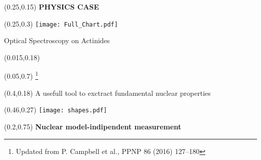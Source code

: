 \documentclass[10pt,aspectratio=169]{beamer}
\begin{document}
\begin{SectionTitle}
\begin{frame}
	\centering
	\begin{textblock*}{0.5\paperwidth}(0.25\paperwidth,0.15\paperheight)
		\centering
		\textbf{\LARGE PHYSICS CASE}	
	\end{textblock*}
	\begin{textblock*}{0.5\paperwidth}(0.25\paperwidth,0.3\paperheight)
        \texttt{[image: Full\_Chart.pdf]}
	\end{textblock*}

\end{frame}
\end{SectionTitle}

\begin{frame}{Optical Spectroscopy on Actinides}
	\begin{textblock*}{0.5\paperwidth}(0.015\paperwidth,0.18\paperheight)
		\begin{textblock*}{0.1\paperwidth}(0.05\paperwidth,0.7\paperheight)
			\footnote{Updated from P. Campbell et al., PPNP 86 (2016) 127–180}
		\end{textblock*}
	\end{textblock*}
	\begin{textblock*}{0.6\paperwidth}(0.4\paperwidth,0.18\paperheight)
		\centering
		A usefull tool to exctract fundamental nuclear properties
	\end{textblock*}
	\begin{textblock*}{0.3\paperwidth}(0.46\paperwidth,0.27\paperheight)
		\texttt{[image: shapes.pdf]}
	\end{textblock*}
	\begin{textblock*}{0.5\paperwidth}(0.2\paperwidth,0.75\paperheight)
		\textbf{Nuclear model-indipendent measurement} 
	\end{textblock*}
\end{frame}
\end{document}
